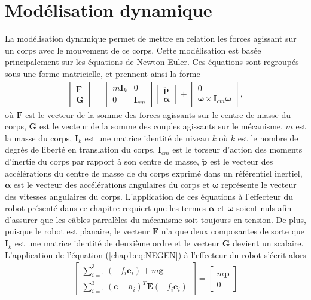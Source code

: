 \section{Modélisation dynamique}
La modélisation dynamique permet de mettre en relation les forces agissant sur un corps avec le mouvement de ce corps. Cette modélisation est basée principalement sur les équations de Newton-Euler. Ces équations sont regroupés sous une forme matricielle, et prennent ainsi la forme
\begin{align}
\begin{bmatrix}
\mathbf{F}\\\mathbf{G}
\end{bmatrix} =
\begin{bmatrix}
m\mathbf{I}_k & 0 \\
0 & \mathbf{I}_{cm}
\end{bmatrix}
\begin{bmatrix}
\ddot{\mathbf{p}}\\\bm{\alpha}
\end{bmatrix} + 
\begin{bmatrix}
0 \\
\bm{\omega} \times \mathbf{I}_{cm}\bm{\omega}
\end{bmatrix}, \label{chap1:eq:NEGEN}
\end{align}
où $\mathbf{F}$ est le vecteur de la somme des forces agissants sur le centre de masse du corps, $\mathbf{G}$ est le vecteur de la somme des couples agissants sur le mécanisme, $m$ est la masse du corps, $\mathbf{I}_k$ est une matrice identité de niveau $k$ où $k$ est le nombre de degrés de liberté en translation du corps, $\mathbf{I}_{cm}$ est le torseur d'action des moments d'inertie du corps par rapport à son centre de masse, $\ddot{\mathbf{p}}$ est le vecteur des accélérations du centre de masse de du corps exprimé dans un référentiel inertiel, $\bm{\alpha}$ est le vecteur des accélérations angulaires du corps et $\bm{\omega}$ représente le vecteur des vitesses angulaires du corps. L'application de ces équations à l'effecteur du robot présenté dans ce chapitre requiert que les termes $\bm{\alpha}$ et $\bm{\omega}$ soient nuls afin d'assurer que les câbles parralèles du mécanisme soit toujours en tension. De plus, puisque le robot est planaire, le vecteur $\mathbf{F}$ n'a que deux composantes de sorte que $\mathbf{I}_k$ est une matrice identité de deuxième ordre et le vecteur $\mathbf{G}$ devient un scalaire. L'application de l'équation (\ref{chap1:eq:NEGEN}) à l'effecteur du robot s'écrit alors 
\begin{align}
\begin{bmatrix}
\sum\limits_{i=1}^3\left(-f_i\mathbf{e}_i\right)+m\mathbf{g}\\
\sum\limits_{i=1}^3\left(\mathbf{c}-\mathbf{a}_i\right)^T\mathbf{E}\left(-f_i\mathbf{e}_i\right)
\end{bmatrix} = 
\begin{bmatrix}
m\ddot{\mathbf{p}}\\
0
\end{bmatrix}
\label{chap1:eq:NE}
\end{align} 
